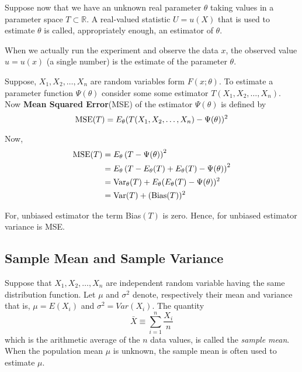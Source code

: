 \begin{definition}[Estimators]
    Suppose now that we have an unknown real parameter $ \theta $ taking values in a parameter space $ T \subset \mathds{R} $. A real-valued statistic $ U = u(X) $ that is used to estimate $ \theta $ is called, appropriately enough, an estimator of $ \theta $.
\end{definition}

When we actually run the experiment and observe the data $ x $, the observed value $ u = u(x) $ (a single number) is the estimate of the parameter $ \theta $.

Suppose, $ X_1, X_2, \ldots , X_n $ are random variables form $ F(x;\theta) $. To estimate a parameter function $ \Psi(\theta) $ consider some some estimator $ T(X_1,X_2,\ldots,X_n) $. Now \textbf{Mean Squared Error}(MSE) of the estimator $ \Psi(\theta) $ is defined by
\begin{equation}
    \label{eq:MSE}
    \text{MSE}(T) = E_{\theta} (T(X_1,X_2,\ldots,X_n) - \Psi(\theta))^{2} 
\end{equation}

Now,
\begin{align*}
    \text{MSE}(T) &= E_{\theta} \left(T-\Psi(\theta)\right)^{2}\\ 
                &= E_{\theta} \left( T - E_{\theta}(T) + E_{\theta}(T) - \Psi(\theta)  \right)^{2}\\ 
                &= \text{Var}_{\theta}(T) + E_{\theta} (E_{\theta}(T) - \Psi(\theta) )^{2} \\
                &= \text{Var}(T) + (\text{Bias}(T))^{2}
\end{align*}

For, unbiased estimator the term Bias$(T)$ is zero. Hence, for unbiased estimator variance is MSE.

\subsection*{Sample Mean and Sample Variance}
Suppose that $ X_1,X_2,\ldots,X_n $ are independent random variable having the same
distribution function. Let $ \mu $ and $ \sigma ^{2} $ denote, respectively 
their mean and variance that is, $ \mu = E(X_i) $ and $ \sigma ^{2} = Var(X_i) $.
The quantity
\[
	\bar{X} \equiv \sum_{i=1}^{n} \frac{X_i}{n}
\]
which is the arithmetic average of the $ n $ data values, is called the \textit{sample mean}.
When the population mean $ \mu $ is unknown, the sample mean is often used to estimate $ \mu .$

